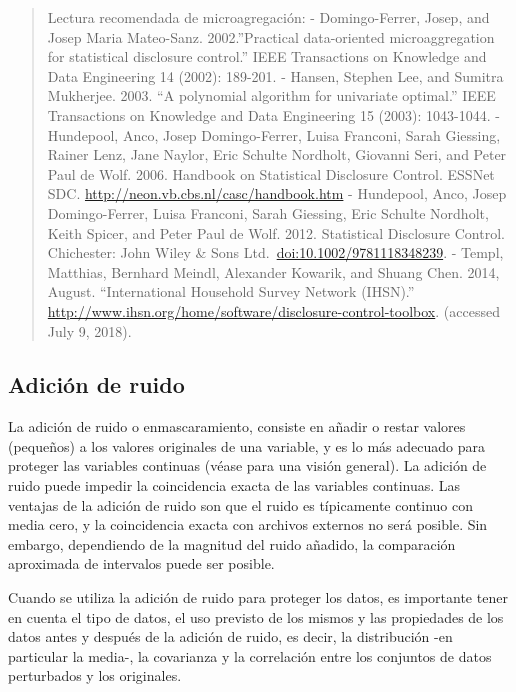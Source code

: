 \documentclass[
]{book}
\theoremstyle{definition}
\theoremstyle{definition}
\theoremstyle{definition}
\theoremstyle{definition}
\theoremstyle{remark}
\begin{document}
\begin{quote}
Lectura recomendada de microagregación:
- Domingo-Ferrer, Josep, and Josep Maria Mateo-Sanz. 2002.''Practical data-oriented microaggregation for statistical disclosure control.'' IEEE Transactions on Knowledge and Data Engineering 14 (2002): 189-201.
- Hansen, Stephen Lee, and Sumitra Mukherjee. 2003. ``A polynomial algorithm for univariate optimal.'' IEEE Transactions on Knowledge and Data Engineering 15 (2003): 1043-1044.
- Hundepool, Anco, Josep Domingo-Ferrer, Luisa Franconi, Sarah Giessing, Rainer Lenz, Jane Naylor, Eric Schulte Nordholt, Giovanni Seri, and Peter Paul de Wolf. 2006. Handbook on Statistical Disclosure Control. ESSNet SDC. \url{http://neon.vb.cbs.nl/casc/handbook.htm}
- Hundepool, Anco, Josep Domingo-Ferrer, Luisa Franconi, Sarah Giessing, Eric Schulte Nordholt, Keith Spicer, and Peter Paul de Wolf. 2012. Statistical Disclosure Control. Chichester: John Wiley \& Sons Ltd.~\url{doi:10.1002/9781118348239}.
- Templ, Matthias, Bernhard Meindl, Alexander Kowarik, and Shuang Chen. 2014, August. ``International Household Survey Network (IHSN).'' \url{http://www.ihsn.org/home/software/disclosure-control-toolbox}. (accessed July 9, 2018).
\end{quote}

\hypertarget{adiciuxf3n-de-ruido}{%
\subsection{Adición de ruido}\label{adiciuxf3n-de-ruido}}

La adición de ruido o enmascaramiento, consiste en añadir o restar valores (pequeños) a los valores originales de una variable, y es lo más adecuado para proteger las variables continuas (véase \citep{Bran02} para una visión general). La adición de ruido puede impedir la coincidencia exacta de las variables continuas. Las ventajas de la adición de ruido son que el ruido es típicamente continuo con media cero, y la coincidencia exacta con archivos externos no será posible. Sin embargo, dependiendo de la magnitud del ruido añadido, la comparación aproximada de intervalos puede ser posible.

Cuando se utiliza la adición de ruido para proteger los datos, es importante tener en cuenta el tipo de datos, el uso previsto de los mismos y las propiedades de los datos antes y después de la adición de ruido, es decir, la distribución -en particular la media-, la covarianza y la correlación entre los conjuntos de datos perturbados y los originales.
\end{document}
